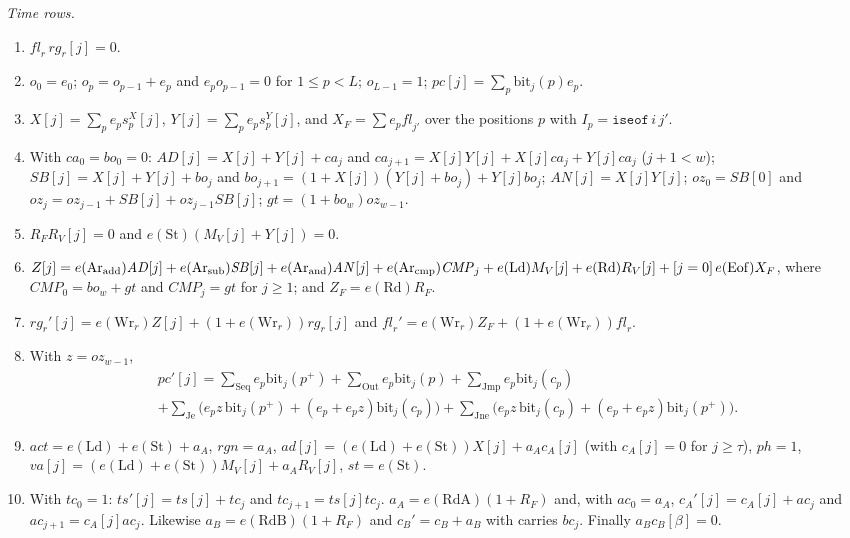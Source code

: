 \emph{Time rows.}
\begin{enumerate}[label=(T\arabic*)]
\item \(\mathit{fl}_r\,\mathit{rg}_r[j]=0\).
\item \(o_0=e_0\); \(o_p=o_{p-1}+e_p\) and \(e_po_{p-1}=0\) for
\(1\le p<L\); \(o_{L-1}=1\); \(\mathit{pc}[j]=\sum_p\mathrm{bit}_j(p)e_p\).
\item \(X[j]=\sum_pe_ps^X_p[j]\), \(Y[j]=\sum_pe_ps^Y_p[j]\), and
\(X_F=\sum e_p\mathit{fl}_{j'}\) over the positions \(p\) with
\(I_p=\mathtt{iseof}\,i\,j'\).
\item With \(\mathit{ca}_0=\mathit{bo}_0=0\):
\(\mathit{AD}[j]=X[j]+Y[j]+\mathit{ca}_j\) and
\(\mathit{ca}_{j+1}=X[j]Y[j]+X[j]\mathit{ca}_j+Y[j]\mathit{ca}_j\)
(\(j+1<w\)); \(\mathit{SB}[j]=X[j]+Y[j]+\mathit{bo}_j\) and
\(\mathit{bo}_{j+1}=(1+X[j])(Y[j]+\mathit{bo}_j)+Y[j]\mathit{bo}_j\);
\(\mathit{AN}[j]=X[j]Y[j]\); \(\mathit{oz}_0=\mathit{SB}[0]\) and
\(\mathit{oz}_j=\mathit{oz}_{j-1}+\mathit{SB}[j]+\mathit{oz}_{j-1}
\mathit{SB}[j]\); \(\mathit{gt}=(1+\mathit{bo}_w)\mathit{oz}_{w-1}\).
\item \(R_FR_V[j]=0\) and \(e(\mathrm{St})(M_V[j]+Y[j])=0\).
\item \(Z[j]=e(\mathrm{Ar}_{\rm add})\mathit{AD}[j]
+e(\mathrm{Ar}_{\rm sub})\mathit{SB}[j]+e(\mathrm{Ar}_{\rm and})
\mathit{AN}[j]+e(\mathrm{Ar}_{\rm cmp})\mathit{CMP}_j+e(\mathrm{Ld})
M_V[j]+e(\mathrm{Rd})R_V[j]+[j=0]\,e(\mathrm{Eof})X_F\), where
\(\mathit{CMP}_0=\mathit{bo}_w+\mathit{gt}\) and
\(\mathit{CMP}_j=\mathit{gt}\) for \(j\ge1\); and
\(Z_F=e(\mathrm{Rd})R_F\).
\item \(\mathit{rg}_r'[j]=e(\mathrm{Wr}_r)Z[j]+(1+e(\mathrm{Wr}_r))
\mathit{rg}_r[j]\) and \(\mathit{fl}_r'=e(\mathrm{Wr}_r)Z_F
+(1+e(\mathrm{Wr}_r))\mathit{fl}_r\).
\item With \(z=\mathit{oz}_{w-1}\),
\begin{multline*}
 \mathit{pc}'[j]=\sum_{\mathrm{Seq}}e_p\mathrm{bit}_j(p^+)
 +\sum_{\mathrm{Out}}e_p\mathrm{bit}_j(p)
 +\sum_{\mathrm{Jmp}}e_p\mathrm{bit}_j(c_p)\\
 +\sum_{\mathrm{Je}}\bigl(e_pz\,\mathrm{bit}_j(p^+)
 +(e_p+e_pz)\mathrm{bit}_j(c_p)\bigr)
 +\sum_{\mathrm{Jne}}\bigl(e_pz\,\mathrm{bit}_j(c_p)
 +(e_p+e_pz)\mathrm{bit}_j(p^+)\bigr).
\end{multline*}
\item \(\mathit{act}=e(\mathrm{Ld})+e(\mathrm{St})+a_A\),
\(\mathit{rgn}=a_A\),
\(\mathit{ad}[j]=(e(\mathrm{Ld})+e(\mathrm{St}))X[j]+a_Ac_A[j]\)
(with \(c_A[j]=0\) for \(j\ge\tau\)), \(\mathit{ph}=1\),
\(\mathit{va}[j]=(e(\mathrm{Ld})+e(\mathrm{St}))M_V[j]+a_AR_V[j]\),
\(\mathit{st}=e(\mathrm{St})\).
\item With \(\mathit{tc}_0=1\): \(\mathit{ts}'[j]=\mathit{ts}[j]
+\mathit{tc}_j\) and \(\mathit{tc}_{j+1}=\mathit{ts}[j]\mathit{tc}_j\).
\(a_A=e(\mathrm{RdA})(1+R_F)\) and, with \(\mathit{ac}_0=a_A\),
\(c_A'[j]=c_A[j]+\mathit{ac}_j\) and
\(\mathit{ac}_{j+1}=c_A[j]\mathit{ac}_j\). Likewise
\(a_B=e(\mathrm{RdB})(1+R_F)\) and \(c_B'=c_B+a_B\) with carries
\(\mathit{bc}_j\). Finally \(a_Bc_B[\beta]=0\).
\end{enumerate}
